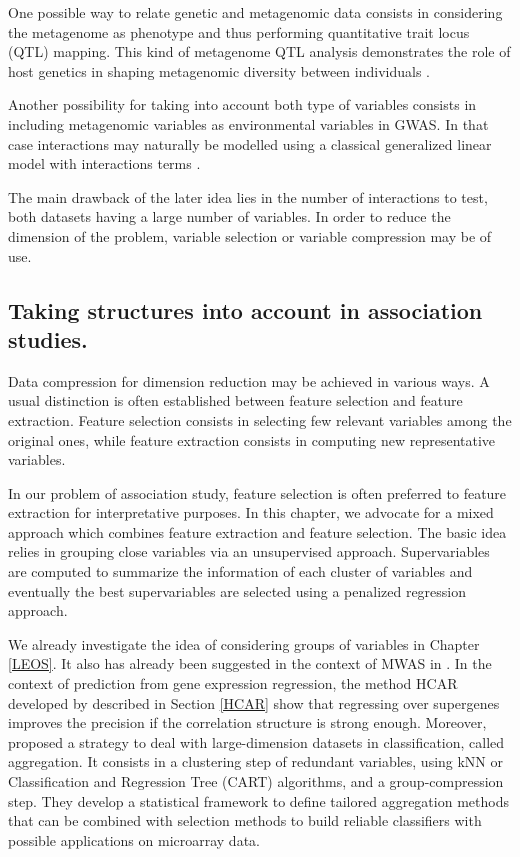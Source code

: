 \documentclass[]{book}
\begin{document}
One possible way to relate genetic and metagenomic data consists in
considering the metagenome as phenotype and thus performing quantitative
trait locus (QTL) mapping. This kind of metagenome QTL analysis
demonstrates the role of host genetics in shaping metagenomic diversity
between individuals \citep{wang2016genome, srinivas2013genome}.

Another possibility for taking into account both type of variables
consists in including metagenomic variables as environmental variables
in GWAS. In that case interactions may naturally be modelled using a
classical generalized linear model with interactions terms
\citep{lin2013interactionsGLM}.

The main drawback of the later idea lies in the number of interactions
to test, both datasets having a large number of variables. In order to
reduce the dimension of the problem, variable selection or variable
compression may be of use.

\hypertarget{taking-structures-into-account-in-association-studies.}{%
\subsection{Taking structures into account in association studies.}\label{taking-structures-into-account-in-association-studies.}}

Data compression for dimension reduction may be achieved in various
ways. A usual distinction is often established between feature selection
and feature extraction. Feature selection consists in selecting few
relevant variables among the original ones, while feature extraction
consists in computing new representative variables.

In our problem of association study, feature selection is often
preferred to feature extraction for interpretative purposes. In this
chapter, we advocate for a mixed approach which combines feature
extraction and feature selection. The basic idea relies in grouping
close variables via an unsupervised approach. Supervariables are
computed to summarize the information of each cluster of variables and
eventually the best supervariables are selected using a penalized
regression approach.

We already investigate the idea of considering groups of variables in
Chapter \ref{LEOS}. It also has already been suggested in the context
of MWAS in \citep{qin2012metagenome}. In the context of prediction from gene
expression regression, the method HCAR developed by
\citep{park_averaged_2007} described in Section \ref{HCAR} show that
regressing over supergenes improves the precision if the correlation
structure is strong enough. Moreover, \citep{mary2009tailored} proposed a
strategy to deal with large-dimension datasets in classification, called
aggregation. It consists in a clustering step of redundant variables,
using kNN or Classification and Regression Tree (CART) algorithms, and a
group-compression step. They develop a statistical framework to define
tailored aggregation methods that can be combined with selection methods
to build reliable classifiers with possible applications on microarray
data.
\end{document}
